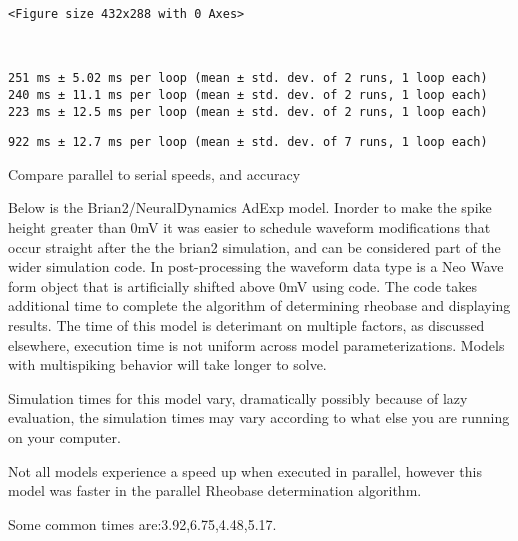 \documentclass[11pt]{article}
\begin{document}
    
    \begin{verbatim}
<Figure size 432x288 with 0 Axes>
    \end{verbatim}

    
    \begin{center}
    \end{center}
    { \hspace*{\fill} \\}
    
    \begin{Verbatim}[commandchars=\\\{\}]
251 ms ± 5.02 ms per loop (mean ± std. dev. of 2 runs, 1 loop each)
240 ms ± 11.1 ms per loop (mean ± std. dev. of 2 runs, 1 loop each)
223 ms ± 12.5 ms per loop (mean ± std. dev. of 2 runs, 1 loop each)
    \end{Verbatim}

    \begin{Verbatim}[commandchars=\\\{\}]
922 ms ± 12.7 ms per loop (mean ± std. dev. of 7 runs, 1 loop each)
    \end{Verbatim}

    Compare parallel to serial speeds, and accuracy

    Below is the Brian2/NeuralDynamics AdExp model. Inorder to make the
spike height greater than 0mV it was easier to schedule waveform
modifications that occur straight after the the brian2 simulation, and
can be considered part of the wider simulation code. In post-processing
the waveform data type is a Neo Wave form object that is artificially
shifted above 0mV using code. The code takes additional time to complete
the algorithm of determining rheobase and displaying results. The time
of this model is deterimant on multiple factors, as discussed elsewhere,
execution time is not uniform across model parameterizations. Models
with multispiking behavior will take longer to solve.

Simulation times for this model vary, dramatically possibly because of
lazy evaluation, the simulation times may vary according to what else
you are running on your computer.

Not all models experience a speed up when executed in parallel, however
this model was faster in the parallel Rheobase determination algorithm.

Some common times are:3.92,6.75,4.48,5.17.
\end{document}
